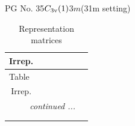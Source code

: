 \documentclass[fleqn,8pt,landscape]{jsarticle}
\begin{document}
\setcounter{MaxMatrixCols}{32}

\renewcommand{\tablename}{Table~}
\renewcommand{\figurename}{Figure~}
\begin{center}
\LARGE
PG No. 35\quad$C_{\rm 3v}(1)$\quad$3m$\quad(31m setting)\quad[ trigonal ]
\end{center}
\renewcommand{\arraystretch}{1.2}
\begin{longtable}{ccccccc}
\caption{Representation matrices}
 \\
 \hline \hline
Irrep. &  &  &  &  &  &  \\ \hline \endfirsthead

\multicolumn{6}{l}{\tablename\ \thetable{}} \\
 \hline \hline
Irrep. &  &  &  &  &  &  \\ \hline \endhead

 \hline \hline
\multicolumn{6}{r}{\footnotesize\it continued ...} \\ \endfoot

 \hline \hline
\multicolumn{6}{r}{} \\ \endlastfoot


\end{longtable}
\end{document}
